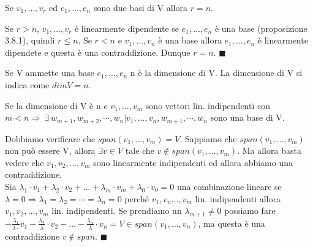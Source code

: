 \begin{corollary}
	Se $v_1, \ldots, v_r$ ed $e_1, \ldots, e_n$ sono due basi di V allora $r=n$.
\end{corollary}

\begin{demostration}
	Se $r>n$, $v_1, \ldots, v_r$ è linearmente dipendente se $e_1, \ldots, e_n$ è una base (proposizione 3.8.1), quindi $r\leq n$. Se $r<n$ e $v_1, \ldots, v_n$ è una base allora $e_1, \ldots, e_n$ è linearmente dipendete e questa è una contraddizione. Dunque $r=n$. $\blacksquare$
\end{demostration}

\begin{definition}[Dimensione di un V]
Se V ammette una base $e_1, \ldots, e_n$ n è la dimensione di V. La dimensione di V si indica come $dim V = n$.
\end{definition}

\begin{corollary}
Se la dimensione di V è n e $v_1, \ldots, v_m$ sono vettori lin. indipendenti con $m<n \Longrightarrow \:\exists\: w_{m+1}, w_{m+2}, \cdots, w_n \vert v_1, \ldots, v_n, w_{m+1}, \cdots, w_n$ sono una base di V. 
\end{corollary}

\begin{demostration}
Dobbiamo verificare che $span(v_1, \ldots, v_m) = V$. Sappiamo che $span(v_1, \ldots, v_m)$ non può essere V, allora $\exists v \in V$ tale che $v \notin span(v_1, \ldots, v_m)$. Ma allora basta vedere che $v_1, v_2, \ldots, v_m$ sono linearmente indipendenti ed allora abbiamo una contraddizione.\\
Sia $\lambda_1 \cdot v_1 + \lambda_2 \cdot v_2 + \ldots + \lambda_m \cdot v_m + \lambda_0 \cdot v_0 = 0$ una combinazione lineare se $\lambda=0 \Longrightarrow \lambda_1 = \lambda_2 = \cdots = \lambda_n = 0$ perché $v_1, v_n \ldots, v_m$ lin. indipendenti allora $v_1, v_2, \ldots, v_m$ lin. indipendenti. Se prendiamo un $\lambda_{m+1}\neq 0$ possiamo fare $-\frac{\lambda_1}{\lambda \cdot }v_1 - \frac{\lambda_2}{\lambda} \cdot v_2 - \ldots - \frac{\lambda_n}{\lambda} \cdot v_n = V \in span(v_1, \ldots, v_n)$, ma questa è una contraddizione $v \notin span$. $\blacksquare$
\end{demostration}

